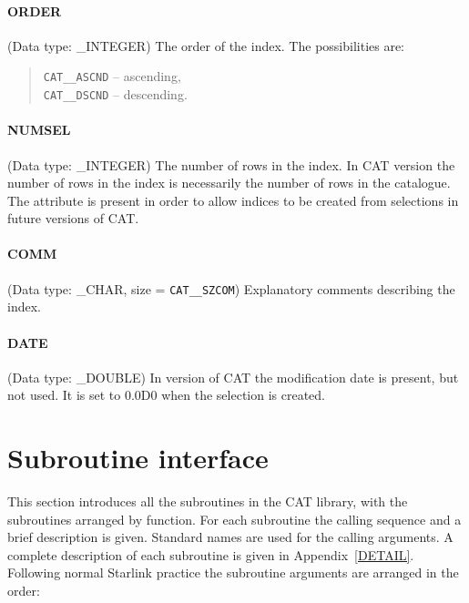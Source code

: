 \paragraph{ORDER}
(Data type: \_INTEGER)
The order of the index. The possibilities are:

\begin{verse}
{\tt CAT\_\_ASCND} -- ascending,  \\
{\tt CAT\_\_DSCND} -- descending.
\end{verse}

\paragraph{NUMSEL}
(Data type: \_INTEGER)
The number of rows in the index. In CAT version \CATversion the number
of rows in the index is necessarily the number of rows in the catalogue.
The attribute is present in order to allow indices to be created from
selections in future versions of CAT.

\paragraph{COMM}
(Data type: \_CHAR, size = {\tt CAT\_\_SZCOM})
Explanatory comments describing the index.

\paragraph{DATE}
(Data type: \_DOUBLE)
In version \CATversion of CAT the modification date is present, but
not used. It is set to 0.0D0 when the selection is created.


\section{\label{SUBINT}Subroutine interface}


% 



This section introduces all the subroutines in the CAT library, with the
subroutines arranged by function. For each subroutine the calling
sequence and a brief description is given. Standard names are used for
the calling arguments. A complete description of each subroutine is
given in Appendix~\ref{DETAIL}. Following normal Starlink practice the
subroutine arguments are arranged in the order:

